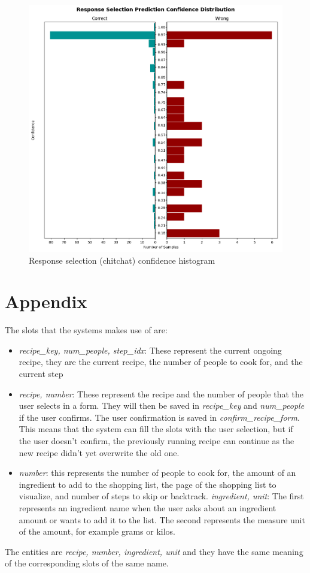 \documentclass[journal, 11pt]{IEEEtran}
\begin{document}
\begin{figure}[ht]
    \centering
    \includegraphics[width=\textwidth]{figures/response_selection_histogram.png}
    \caption{Response selection (chitchat) confidence histogram}
    \label{fig:resp-sel-hist}
\end{figure}

\clearpage
\onecolumn
\section*{Appendix}
The slots that the systems makes use of are:
\begin{itemize}
    \item \textit{recipe\_key, num\_people, step\_idx}: These represent the current ongoing recipe, they are the current recipe, the number of people to cook for, and the current step
    \item \textit{recipe, number}: These represent the recipe and the number of people that the user selects in a form. They will then be saved in \textit{recipe\_key} and \textit{num\_people} if the user confirms. The user confirmation is saved in \textit{confirm\_recipe\_form}. This means that the system can fill the slots with the user selection, but if the user doesn't confirm, the previously running recipe can continue as the new recipe didn't yet overwrite the old one.
    \item \textit{number}: this represents the number of people to cook for, the amount of an ingredient to add to the shopping list, the page of the shopping list to visualize, and number of steps to skip or backtrack.
    \textit{ingredient, unit}: The first represents an ingredient name when the user asks about an ingredient amount or wants to add it to the list. The second represents the measure unit of the amount, for example grams or kilos.
\end{itemize}
The entities are \textit{recipe, number, ingredient, unit} and they have the same meaning of the corresponding slots of the same name.


\ifCLASSOPTIONcaptionsoff
  \newpage
\fi
\end{document}
